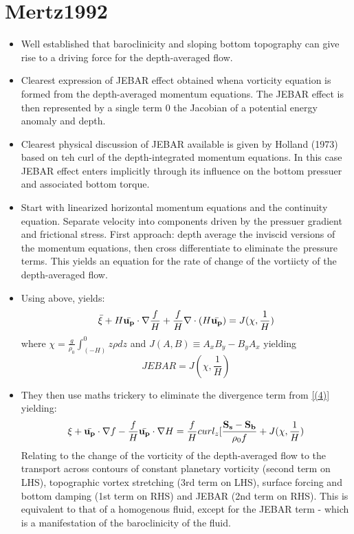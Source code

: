 \documentclass[..\Papers.tex]{subfiles}
\begin{document}
\section{Mertz1992}
\citep{Mertz1992}


\begin{itemize}
    \item Well established that baroclinicity and sloping bottom topography can give rise to a driving force for the depth-averaged flow.
    \item Clearest expression of JEBAR effect obtained whena vorticity equation is formed from the depth-averaged momentum equations. The JEBAR effect is then represented by a single term 0 the Jacobian of a potential energy anomaly and depth. 
    \item Clearest physical discussion of JEBAR available is given by Holland (1973) based on teh curl of the depth-integrated momentum equations. In this case JEBAR effect enters implicitly through its influence on the bottom pressuer and associated bottom torque.
    \item Start with linearized horizontal momentum equations and the continuity equation. Separate velocity into components driven by the pressuer gradient and frictional stress. First approach: depth average the inviscid versions of the momentum equations, then cross differentiate to eliminate the pressure terms. This yields an equation for the rate of change of the vortiicty of the depth-averaged flow.
    \item Using above, yields:
        \begin{equation} \label{(4)}
            \bar{\xi}+H\bar{\bf{u}_p}\cdot\nabla\frac{f}{H}+\frac{f}{H}\nabla\cdot(H\bar{\bf{u}_p})=J(\chi,\frac{1}{H})
        \end{equation}
        where $\chi=\frac{g}{\rho_0}\int_(-H)^0z\rho dz$ and $J(A,B)\equiv A_x B_y - B_y A_x$
        yielding 
        \begin{equation}
            JEBAR=J(\chi,\frac{1}{H})
        \end{equation}
    \item They then use maths trickery to eliminate the divergence term from \ref{(4)} yielding:
        \begin{equation}
            \xi+\bar{\bf{u}_p}\cdot\nabla f-\frac{f}{H}\bar{\bf{u}_p}\cdot\nabla H = \frac{f}{H}curl_z[\frac{\bf{S}_s-\bf{S}_b}{\rho_0 f} + J(\chi,\frac{1}{H})
        \end{equation}
        Relating to the change of the vorticity of the depth-averaged flow to the transport across contours of constant planetary vorticity (second term on LHS), topographic vortex stretching (3rd term on LHS), surface forcing and bottom damping (1st term on RHS) and JEBAR (2nd term on RHS). This is equivalent to that of a homogenous fluid, except for the JEBAR term - which is a manifestation of the baroclinicity of the fluid.

\end{itemize}
\end{document}
